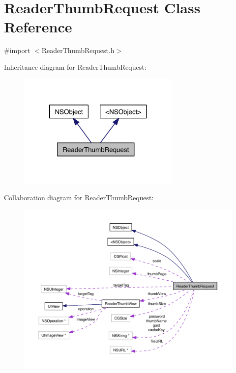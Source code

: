\hypertarget{interface_reader_thumb_request}{\section{Reader\-Thumb\-Request Class Reference}
\label{dc/dc5/interface_reader_thumb_request}
}


{\ttfamily \#import $<$Reader\-Thumb\-Request.\-h$>$}



Inheritance diagram for Reader\-Thumb\-Request\-:
\nopagebreak
\begin{figure}[H]
\begin{center}
\leavevmode
\includegraphics[width=227pt]{dd/da3/interface_reader_thumb_request__inherit__graph}
\end{center}
\end{figure}


Collaboration diagram for Reader\-Thumb\-Request\-:
\nopagebreak
\begin{figure}[H]
\begin{center}
\leavevmode
\includegraphics[width=350pt]{d8/dc9/interface_reader_thumb_request__coll__graph}
\end{center}
\end{figure}
